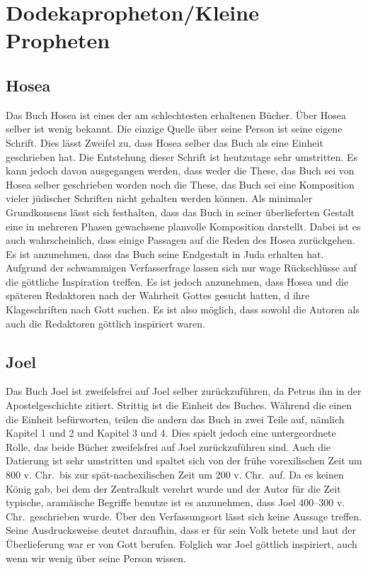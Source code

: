 \section{Dodekapropheton/Kleine Propheten}
\subsection*{Hosea}
Das Buch Hosea ist eines der am schlechtesten erhaltenen Bücher. Über Hosea selber ist wenig bekannt. Die einzige Quelle über seine Person ist seine eigene Schrift. Dies lässt Zweifel zu, dass Hosea selber das Buch als eine Einheit geschrieben hat. Die Entstehung dieser Schrift ist heutzutage sehr umstritten. Es kann jedoch davon ausgegangen werden, dass weder die These, das Buch sei von Hosea selber geschrieben worden noch die These, das Buch sei eine Komposition vieler jüdischer Schriften nicht gehalten werden können. Als minimaler Grundkonsens lässt sich festhalten, dass das Buch in seiner überlieferten Gestalt eine in mehreren Phasen gewachsene planvolle Komposition darstellt. Dabei  ist es auch wahrscheinlich, dass einige Passagen auf die Reden des Hosea zurückgehen. Es ist anzunehmen, dass das Buch seine Endgestalt in Juda erhalten hat. Aufgrund der schwammigen Verfasserfrage lassen sich nur wage Rückschlüsse auf die göttliche Inspiration treffen. Es ist jedoch anzunehmen, dass Hosea und die späteren Redaktoren nach der Wahrheit Gottes gesucht hatten, d ihre Klageschriften nach Gott suchen. Es ist also möglich, dass sowohl die Autoren als auch die Redaktoren göttlich inspiriert waren.

\subsection*{Joel}
Das Buch Joel ist zweifelsfrei auf Joel selber zurückzuführen, da Petrus ihn in der Apostelgeschichte zitiert. Strittig ist die Einheit des Buches. Während die einen die Einheit befürworten, teilen die andern das Buch in zwei Teile auf, nämlich Kapitel 1 und 2 und Kapitel 3 und 4. Dies spielt jedoch eine untergeordnete Rolle, das beide Bücher zweifelsfrei auf Joel zurückzuführen sind. Auch die Datierung ist sehr umstritten und spaltet sich von der frühe vorexilischen Zeit um 800 v. Chr.\ bis zur spät-nachexilischen Zeit um 200 v. Chr.\ auf. Da es keinen König gab, bei dem der Zentralkult verehrt wurde und der Autor für die Zeit typische, aramäische Begriffe benutze ist es anzunehmen, dass Joel 400--300 v. Chr.\ geschrieben wurde. Über den Verfassungsort lässt sich keine Aussage treffen. Seine Ausdrucksweise  deutet daraufhin, dass er für sein Volk betete und laut der Überlieferung war er von Gott berufen. Folglich war Joel göttlich inspiriert, auch wenn wir wenig über seine Person wissen.

